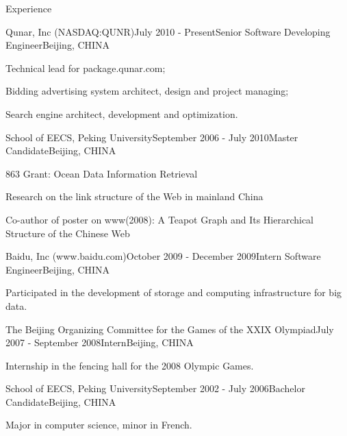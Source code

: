 \documentclass{resume} %
\begin{document}
\begin{rSection}{Experience}

\begin{rSubsection}{Qunar, Inc (NASDAQ:QUNR)}{July 2010 - Present}{Senior Software Developing Engineer}{Beijing, CHINA}
\item Technical lead for package.qunar.com;
\item Bidding advertising system architect, design and project managing;
\item Search engine architect, development and optimization.
\end{rSubsection}


\begin{rSubsection}{School of EECS, Peking University}{September 2006 - July 2010}{Master Candidate}{Beijing, CHINA}
\item 863 Grant: Ocean Data Information Retrieval
\item Research on the link structure of the Web in mainland China
\item Co-author of poster on www(2008): A Teapot Graph and Its Hierarchical Structure of the Chinese Web
\end{rSubsection}


\begin{rSubsection}{Baidu, Inc (www.baidu.com)}{October 2009 - December 2009}{Intern Software Engineer}{Beijing, CHINA}
\item Participated in the development of storage and computing infrastructure for big data.
\end{rSubsection}

\begin{rSubsection}{The Beijing Organizing Committee for the Games of
    the XXIX Olympiad}{July 2007 - September 2008}{Intern}{Beijing, CHINA}
\item Internship in the fencing hall for the 2008 Olympic Games.
\end{rSubsection}


\begin{rSubsection}{School of EECS, Peking University}{September 2002 - July 2006}{Bachelor Candidate}{Beijing, CHINA}
\item Major in computer science, minor in French.
\end{rSubsection}


\end{rSection}
\end{document}
